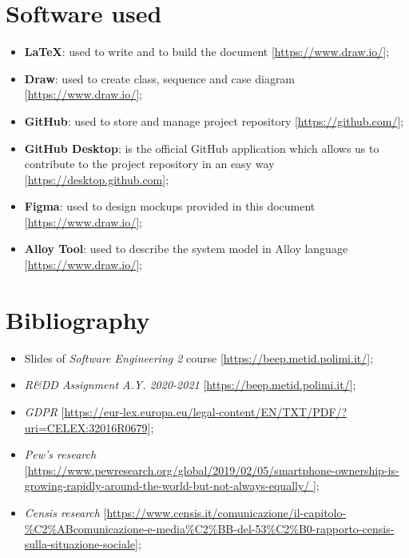 \section{Software used}

\begin{itemize}
\item \textbf{\LaTeX}: used to write and to build the document [\url{https://www.draw.io/}];
\item\textbf{Draw}: used to create class, sequence and case diagram [\url{https://www.draw.io/}];
\item\textbf{GitHub}: used to store and manage project repository [\url{https://github.com/}];
\item\textbf{GitHub Desktop}: is the official GitHub application which allows us to contribute to the project repository in an easy way [\url{https://desktop.github.com}];
\item\textbf{Figma}: used to design mockups provided in this document [\url{https://www.draw.io/}];
\item\textbf{Alloy Tool}: used to describe the system model in Alloy language [\url{https://www.draw.io/}];
\begin{comment}
\item\textbf{}:;
\item\textbf{}:;
\item\textbf{}:;
\end{comment}
\end{itemize}



\section{Bibliography}
\begin{itemize}
\item Slides of \textit{Software Engineering 2} course [\url{https://beep.metid.polimi.it/}];
\item \textit{R\&DD Assignment A.Y. 2020-2021} 
[\url{https://beep.metid.polimi.it/}];
\item \textit{GDPR} 
[\url{https://eur-lex.europa.eu/legal-content/EN/TXT/PDF/?uri=CELEX:32016R0679}]; 
\item \textit{Pew's research}
[\url{https://www.pewresearch.org/global/2019/02/05/smartphone-ownership-is-growing-rapidly-around-the-world-but-not-always-equally/
}];
\item \textit{Censis research}
[\url{https://www.censis.it/comunicazione/il-capitolo-\%C2\%ABcomunicazione-e-media\%C2\%BB-del-53\%C2\%B0-rapporto-censis-sulla-situazione-sociale}];

\end{itemize}

